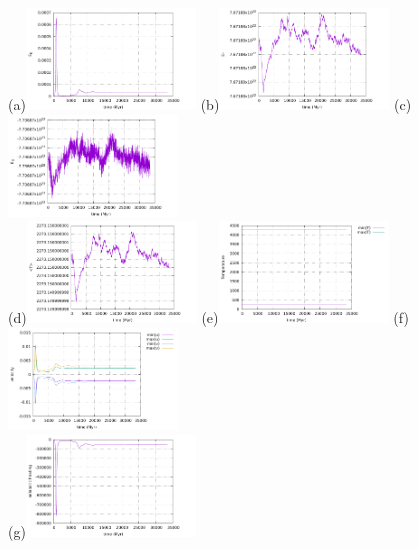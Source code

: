 \begin{center}
(a)\includegraphics[width=4.5cm]{python_codes/fieldstone_24/BA_105/EK}
(b)\includegraphics[width=4.5cm]{python_codes/fieldstone_24/BA_105/ET}
(c)\includegraphics[width=4.5cm]{python_codes/fieldstone_24/BA_105/EG}\\
(d)\includegraphics[width=4.5cm]{python_codes/fieldstone_24/BA_105/Tavrg}
(e)\includegraphics[width=4.5cm]{python_codes/fieldstone_24/BA_105/T_stats}
(f)\includegraphics[width=4.5cm]{python_codes/fieldstone_24/BA_105/vel_stats}\\
(g)\includegraphics[width=4.5cm]{python_codes/fieldstone_24/BA_105/adiabatic_heating}

\end{center}
